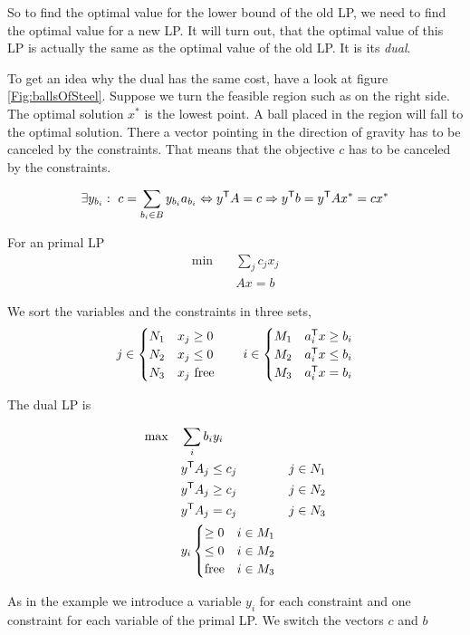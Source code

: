 So to find the optimal value for the lower bound of the old LP, we need to find the optimal value for a new LP. It will turn out, that the optimal value of this LP is actually the same as the optimal value of the old LP. It is its \emph{dual}.

To get an idea why the dual has the same cost, have a look at figure \ref{Fig:ballsOfSteel}. Suppose we turn the feasible region such as on the right side. The optimal solution $x^*$ is the lowest point. A ball placed in the region will fall to the optimal solution. There a vector pointing in the direction of gravity has to be canceled by the constraints. That means that the objective $c$ has to be canceled by the constraints.

\[\exists y_{b_i}:\ c = \sum_{b_i\in B} y_{b_i} a_{b_i} \Leftrightarrow {y}^\text{\upshape \sffamily T} A=c \Rightarrow {y}^\text{\upshape \sffamily T} b = {y}^\text{\upshape \sffamily T} A x^* = cx^*\]


\begin{Def}[Dual]\label{Def:dual} For an primal LP
\begin{align*}
\min \quad & \sum_j c_j x_j\\
\quad & Ax =b
\end{align*}

We sort the variables and the constraints in three sets, 
\[j \in \begin{cases}
N_1 & x_j\geq 0\\
N_2 & x_j\leq 0\\
N_3 & x_j \text{ free}
\end{cases} \qquad i\in \begin{cases}
M_1 & {a}^\text{\upshape \sffamily T}_ix \geq b_i\\
M_2 & {a}^\text{\upshape \sffamily T}_ix \leq b_i\\
M_3 & {a}^\text{\upshape \sffamily T}_ix = b_i
\end{cases}\]

The dual LP is

\begin{align*}
\max \quad & \sum_i b_iy_i\\
& {y}^\text{\upshape \sffamily T} A_j \leq c_j & j\in N_1\\
& {y}^\text{\upshape \sffamily T} A_j \geq c_j & j\in N_2\\
& {y}^\text{\upshape \sffamily T} A_j = c_j & j\in N_3\\
& y_i \begin{cases}
\geq 0 & i\in M_1\\
\leq 0 & i\in M_2\\
\text{free} & i\in M_3
\end{cases}
\end{align*}

As in the example we introduce a variable $y_i$ for each constraint and one constraint for each variable of the primal LP. We switch the vectors $c$ and $b$
\end{Def}

